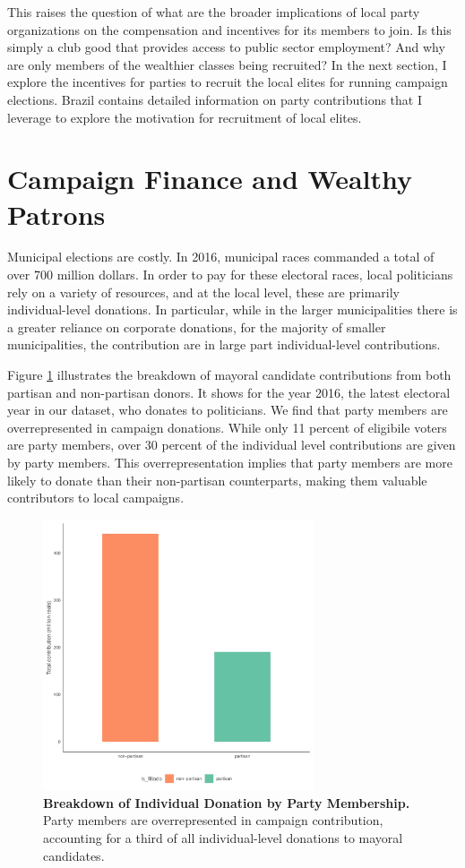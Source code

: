 This raises the question of what are the broader implications of local party organizations on the compensation and incentives for its members to join. Is this simply a club good that provides access to public sector employment? And why are only members of the wealthier classes being recruited? In the next section, I explore the incentives for parties to recruit the local elites for running campaign elections. Brazil contains detailed information on party contributions that I leverage to explore the motivation for recruitment of local elites. 

\section{Campaign Finance and Wealthy Patrons}
Municipal elections are costly. In 2016, municipal races commanded a total of over 700 million dollars. In order to pay for these electoral races, local politicians rely on a variety of resources, and at the local level, these are primarily individual-level donations. In particular, while in the larger municipalities there is a greater reliance on corporate donations, for the majority of smaller municipalities, the contribution are in large part individual-level contributions.

Figure \ref{fig:party_contribution} illustrates the breakdown of mayoral candidate contributions from both partisan and non-partisan donors. It shows for the year 2016, the latest electoral year in our dataset, who donates to politicians. We find that party members are overrepresented in campaign donations. While only 11 percent of eligibile voters are party members, over 30 percent of the individual level contributions are given by party members. This overrepresentation implies that party members are more likely to donate than their non-partisan counterparts, making them valuable contributors to local campaigns.

\begin{figure}
    \centering
    \includegraphics[width = 8cm, height = 8cm]{chapters/chapter_3/figures/partisanship/plot_contribution.pdf}
    \caption{\textbf{Breakdown of Individual Donation by Party Membership.} Party members are overrepresented in campaign contribution, accounting for a third of all individual-level donations to mayoral candidates.}
    \label{fig:party_contribution}
\end{figure}

